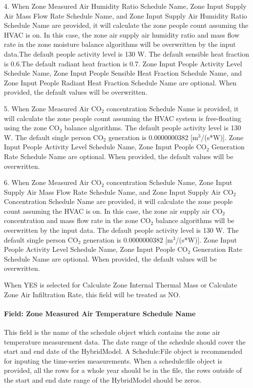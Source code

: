 4. When Zone Measured Air Humidity Ratio Schedule Name, Zone Input Supply Air Mass Flow Rate Schedule Name, and Zone Input Supply Air Humidity Ratio Schedule Name are provided, it will calculate the zone people count assuming the HVAC is on. In this case, the zone air supply air humidity ratio and mass flow rate in the zone moisture balance algorithms will be overwritten by the input data.The default people activity level is 130 W. The default sensible heat fraction is 0.6.The default radiant heat fraction is 0.7. Zone Input People Activity Level Schedule Name, Zone Input People Sensible Heat Fraction Schedule Name, and Zone Input People Radiant Heat Fraction Schedule Name are optional. When provided, the default values will be overwritten.

5. When Zone Measured Air CO$_2$ concentration Schedule Name is provided, it will calculate the zone people count assuming the HVAC system is free-floating using the zone CO$_2$ balance algorithms. The default people activity level is 130 W. The default single person CO$_2$ generation is 0.0000000382 [m$^3$/(s*W)]. Zone Input People Activity Level Schedule Name, Zone Input People CO$_2$ Generation Rate Schedule Name are optional. When provided, the default values will be overwritten.

6. When Zone Measured Air CO$_2$ concentration Schedule Name, Zone Input Supply Air Mass Flow Rate Schedule Name, and Zone Input Supply Air CO$_2$ Concentration Schedule Name are provided, it will calculate the zone people count assuming the HVAC is on. In this case, the zone air supply air CO$_2$ concentration and mass flow rate in the zone CO$_2$ balance algorithms will be overwritten by the input data. The default people activity level is 130 W. The default single person CO$_2$ generation is 0.0000000382 [m$^3$/(s*W)]. Zone Input People Activity Level Schedule Name, Zone Input People CO$_2$ Generation Rate Schedule Name are optional. When provided, the default values will be overwritten.

When YES is selected for Calculate Zone Internal Thermal Mass or Calculate Zone Air Infiltration Rate, this field will be treated as NO.

\paragraph{Field: Zone Measured Air Temperature Schedule Name}\label{field-zone-measured-air-temperature-schedule-name-hm}

This field is the name of the schedule object which contains the zone air temperature measurement data. The date range of the schedule should cover the start and end date of the HybridModel. A Schedule:File object is recommended for inputing the time-series measurements. When a schedule:file object is provided, all the rows for a whole year should be in the file, the rows outside of the start and end date range of the HybridModel should be zeros.

